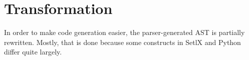 
\section{Transformation}

\label{sec:transformer}

In order to make code generation easier, the parser-generated AST is partially rewritten.  Mostly, that is done because some constructs in SetlX and Python differ quite largely. 